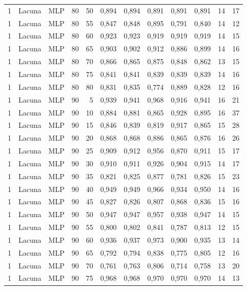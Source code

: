 \begin{longtable}{@{}rllrrrrrrrrr@{}}
1 & Lacuna & MLP & 80 & 50 & 0,894 & 0,894 & 0,891 & 0,891 & 0,891 & 14 & 17 \\
1 & Lacuna & MLP & 80 & 55 & 0,847 & 0,848 & 0,895 & 0,791 & 0,840 & 14 & 12 \\
1 & Lacuna & MLP & 80 & 60 & 0,923 & 0,923 & 0,919 & 0,919 & 0,919 & 14 & 15 \\
1 & Lacuna & MLP & 80 & 65 & 0,903 & 0,902 & 0,912 & 0,886 & 0,899 & 14 & 16 \\
1 & Lacuna & MLP & 80 & 70 & 0,866 & 0,865 & 0,875 & 0,848 & 0,862 & 13 & 15 \\
1 & Lacuna & MLP & 80 & 75 & 0,841 & 0,841 & 0,839 & 0,839 & 0,839 & 14 & 16 \\
1 & Lacuna & MLP & 80 & 80 & 0,831 & 0,835 & 0,774 & 0,889 & 0,828 & 12 & 16 \\
1 & Lacuna & MLP & 90 & 5 & 0,939 & 0,941 & 0,968 & 0,916 & 0,941 & 16 & 21 \\
1 & Lacuna & MLP & 90 & 10 & 0,884 & 0,881 & 0,865 & 0,928 & 0,895 & 16 & 37 \\
1 & Lacuna & MLP & 90 & 15 & 0,846 & 0,839 & 0,819 & 0,917 & 0,865 & 15 & 28 \\
1 & Lacuna & MLP & 90 & 20 & 0,868 & 0,868 & 0,886 & 0,865 & 0,876 & 16 & 26 \\
1 & Lacuna & MLP & 90 & 25 & 0,909 & 0,912 & 0,956 & 0,870 & 0,911 & 15 & 17 \\
1 & Lacuna & MLP & 90 & 30 & 0,910 & 0,911 & 0,926 & 0,904 & 0,915 & 14 & 17 \\
1 & Lacuna & MLP & 90 & 35 & 0,821 & 0,825 & 0,877 & 0,781 & 0,826 & 15 & 23 \\
1 & Lacuna & MLP & 90 & 40 & 0,949 & 0,949 & 0,966 & 0,934 & 0,950 & 14 & 16 \\
1 & Lacuna & MLP & 90 & 45 & 0,827 & 0,826 & 0,807 & 0,868 & 0,836 & 15 & 16 \\
1 & Lacuna & MLP & 90 & 50 & 0,947 & 0,947 & 0,957 & 0,938 & 0,947 & 14 & 15 \\
1 & Lacuna & MLP & 90 & 55 & 0,800 & 0,802 & 0,841 & 0,787 & 0,813 & 12 & 15 \\
1 & Lacuna & MLP & 90 & 60 & 0,936 & 0,937 & 0,973 & 0,900 & 0,935 & 13 & 14 \\
1 & Lacuna & MLP & 90 & 65 & 0,792 & 0,794 & 0,838 & 0,775 & 0,805 & 12 & 16 \\
1 & Lacuna & MLP & 90 & 70 & 0,761 & 0,763 & 0,806 & 0,714 & 0,758 & 13 & 20 \\
1 & Lacuna & MLP & 90 & 75 & 0,968 & 0,968 & 0,970 & 0,970 & 0,970 & 14 & 13 \\

\end{longtable}
